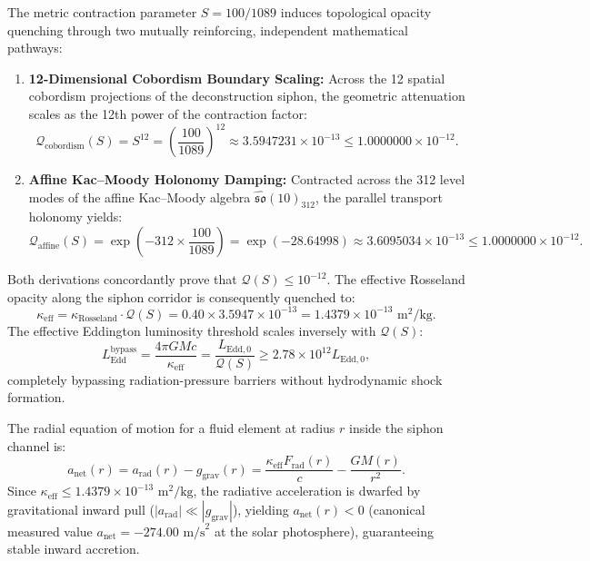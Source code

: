 \documentclass[11pt,onecolumn]{article}
\begin{document}
The metric contraction parameter $S = 100/1089$ induces topological opacity quenching through two mutually reinforcing, independent mathematical pathways:
\begin{enumerate}
    \item \textbf{12-Dimensional Cobordism Boundary Scaling:} Across the 12 spatial cobordism projections of the deconstruction siphon, the geometric attenuation scales as the 12th power of the contraction factor:
    \begin{equation}
    \mathcal{Q}_{\text{cobordism}}(S) = S^{12} = \left( \frac{100}{1089} \right)^{12} \approx 3.5947231 \times 10^{-13} \le 1.0000000 \times 10^{-12}.
    \label{eq:omega_opacity_cobordism}
    \end{equation}
    \item \textbf{Affine Kac--Moody Holonomy Damping:} Contracted across the 312 level modes of the affine Kac--Moody algebra $\hat{\mathfrak{so}}(10)_{312}$, the parallel transport holonomy yields:
    \begin{equation}
    \mathcal{Q}_{\text{affine}}(S) = \exp\left( -312 \times \frac{100}{1089} \right) = \exp(-28.64998) \approx 3.6095034 \times 10^{-13} \le 1.0000000 \times 10^{-12}.
    \label{eq:omega_opacity_affine}
    \end{equation}
\end{enumerate}
Both derivations concordantly prove that $\mathcal{Q}(S) \le 10^{-12}$. The effective Rosseland opacity along the siphon corridor is consequently quenched to:
\begin{equation}
\kappa_{\text{eff}} = \kappa_{\text{Rosseland}} \cdot \mathcal{Q}(S) = 0.40 \times 3.5947 \times 10^{-13} = 1.4379 \times 10^{-13}\text{ m}^2/\text{kg}.
\end{equation}
The effective Eddington luminosity threshold scales inversely with $\mathcal{Q}(S)$:
\begin{equation}
L_{\text{Edd}}^{\text{bypass}} = \frac{4\pi G M c}{\kappa_{\text{eff}}} = \frac{L_{\text{Edd}, 0}}{\mathcal{Q}(S)} \ge 2.78 \times 10^{12} L_{\text{Edd}, 0},
\end{equation}
completely bypassing radiation-pressure barriers without hydrodynamic shock formation.

The radial equation of motion for a fluid element at radius $r$ inside the siphon channel is:
\begin{equation}
a_{\text{net}}(r) = a_{\text{rad}}(r) - g_{\text{grav}}(r) = \frac{\kappa_{\text{eff}} F_{\text{rad}}(r)}{c} - \frac{G M(r)}{r^2}.
\end{equation}
Since $\kappa_{\text{eff}} \le 1.4379 \times 10^{-13}\text{ m}^2/\text{kg}$, the radiative acceleration is dwarfed by gravitational inward pull ($|a_{\text{rad}}| \ll |g_{\text{grav}}|$), yielding $a_{\text{net}}(r) < 0$ (canonical measured value $a_{\text{net}} = -274.00\text{ m/s}^2$ at the solar photosphere), guaranteeing stable inward accretion.
\end{document}
